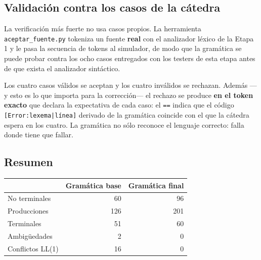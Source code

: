 \subsection{Validación contra los casos de la cátedra}

La verificación más fuerte no usa casos propios. La herramienta
\texttt{aceptar\_fuente.py} tokeniza un fuente \textbf{real} con el analizador léxico de la
Etapa 1 y le pasa la secuencia de tokens al simulador, de modo que la gramática se puede probar
contra los ocho casos entregados con los testers de esta etapa antes de que exista el analizador
sintáctico.


Los cuatro casos válidos se aceptan y los cuatro inválidos se rechazan. Además ---y esto es lo
que importa para la corrección--- el rechazo se produce \textbf{en el token exacto} que declara la
expectativa de cada caso: el \texttt{==} indica que el código \texttt{[Error:lexema|línea]}
derivado de la gramática coincide con el que la cátedra espera en los cuatro. La gramática no sólo
reconoce el lenguaje correcto: falla donde tiene que fallar.

\subsection{Resumen}

\begin{center}
\begin{tabular}{@{}lrr@{}}
\toprule
 & \textbf{Gramática base} & \textbf{Gramática final} \\
\midrule
No terminales            & 60  & 96  \\
Producciones             & 126 & 201 \\
Terminales               & 51  & 60  \\
Ambigüedades             & 2   & 0   \\
Conflictos LL(1)& 16  & 0   \\
\bottomrule
\end{tabular}
\end{center}

